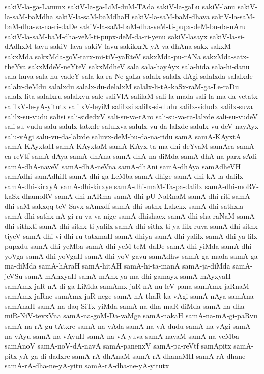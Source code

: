 {sakiV-la-ga-Lanunx
sakiV-la-ga-LiM-duM-TAda
sakiV-la-gaLu
sakiV-lanu
sakiV-la-saM-baMdha
sakiV-la-saM-baMdhaH
sakiV-la-saM-baM-dhava
sakiV-la-saM-baM-dha-va-na-ri-daDe
sakiV-la-saM-baM-dha-veM-ti-pupx-deM-bu-da-nAru
sakiV-la-saM-baM-dha-veM-ti-pupx-deM-da-ri-yenu
sakiV-lasayx
sakiV-la-si-dAdhxM-tavu
sakiV-lava
sakiV-lavu
sakikxrX-yA-va-dhAna
sakx
sakxM
sakxMda
sakxMda-goV-tarx-mi-tiV-yaRteV
sakxMda-pu-rANa
sakxMda-satx-theYva
sakxMdeV-neYteV
sakxMdheV
sala
sala-hayAyx
sala-hida
sala-hi-danu
sala-huva
sala-hu-vadeY
sala-ka-ra-Ne-gaLa
salalx
salalx-dAgi
salalxda
salalxde
salalx-deMdu
salalxdu
salalx-du-delalxM
salalx-li-tA-kaSx-raM-ga-Le-raDu
salalx-lita
salalxru
salalxvu
sale
saliVlA
salilaM
sali-la-mada
sali-la-ma-da-vetatx
salilxV-le-yA-yitutx
salilxV-leyiM
salilxsi
salilx-si-dudu
salilx-sidudx
salilx-suva
salilx-su-vudu
salisi
sali-sidedxV
sali-su-va-rAro
sali-su-va-ra-lalxde
sali-su-vudeV
sali-su-vudu
salu
salulx-tatxde
salulxva
salulx-vu-da-lalxde
salulx-vu-deV-nayAyx
salu-vAgi
salu-vu-da-lalxde
saluvx-deM-bu-da-na-ridu
samA
samA-KAyxtA
samA-KAyxtaH
samA-KAyxtaM
samA-KAyx-ta-ma-dhi-deYvaM
samAca
samA-ca-reVtf
samA-dAya
samA-dhAna
samA-dhA-na-diMda
samA-dhA-na-parx-sAdi
samA-dhA-naveV
samA-dhA-neVna
samA-dhAni
samA-dhAya
samAdheVH
samAdhi
samAdhiH
samA-dhi-ga-LeMba
samA-dhige
samA-dhi-kA-la-dalilx
samA-dhi-kirxyA
samA-dhi-kirxye
samA-dhi-maM-Ta-pa-dalilx
samA-dhi-moRV-kaSx-dhamoRV
samA-dhi-nARma
samA-dhi-pU-NaRnaM
samA-dhi-riti
samA-dhi-saM-sakxqq-teV-Savx-sAmxdf
samA-dhi-sathx-Lakekx
samA-dhi-sathxla
samA-dhi-sathx-nA-gi-ru-va-va-nige
samA-dhishacx
samA-dhi-sha-raNaM
samA-dhi-sithxti
samA-dhi-sithx-ti-yalilx
samA-dhi-sithx-ti-ya-lilx-ruva
samA-dhi-sithx-tiyeV
samA-dhi-vi-dhi-ru-tatxmaH
samA-dhiya
samA-dhi-yalilx
samA-dhi-ya-lilx-pupxdu
samA-dhi-yeMba
samA-dhi-yeM-teM-daDe
samA-dhi-yiMda
samA-dhi-yoVga
samA-dhi-yoVgaH
samA-dhi-yoV-gavu
samAdhw
samA-ga-mada
samA-ga-ma-diMda
samA-hAraH
samA-hitAH
samA-hi-ta-manA
samA-ja-diMda
samA-jeVSu
samA-mAnxyaH
samA-mAnx-ya-ma-dhi-gamayx
samA-mAyxyaH
samAmx-jaR-nA-di-ga-LiMda
samAmx-jaR-nA-nu-leV-pana
samAmx-jaRnaM
samAmx-jaRne
samAmx-jaR-nege
samA-nA-thaR-ka-vAgi
samA-nAya
samAna
samAnaH
samA-na-daq-SiTx-yiMda
samA-na-dha-maR-diMda
samA-na-dha-miR-NiV-tevxVna
samA-na-goM-Da-vaMge
samA-nakaH
samA-na-mA-gi-paRvu
samA-na-rA-gu-tAtxre
samA-na-vAda
samA-na-vA-dudu
samA-na-vAgi
samA-na-vAyu
samA-na-vAyuH
samA-na-vA-yuva
samA-navaM
samA-na-veMba
samAnoV
samA-noV-dA-navA
samA-panenxV
samA-pa-reVtf
samApitx
samA-pitx-yA-ga-di-dadxre
samA-rA-dhAnaM
samA-rA-dhanaMH
samA-rA-dhane
samA-rA-dha-ne-yA-yitu
samA-rA-dha-ne-yA-yitutx
}
